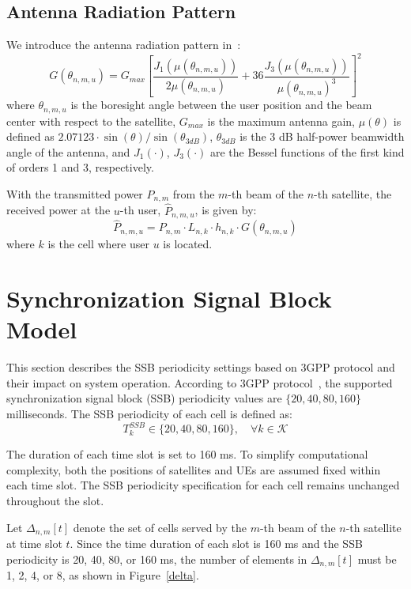 \subsection{Antenna Radiation Pattern}
We introduce the antenna radiation pattern in~\cite{Energy-Efficient}:
\begin{equation}
    G(\theta_{n,m,u}) = G_{max} \left[ \frac{J_1\left(\mu(\theta_{n,m,u})\right)}{2\mu(\theta_{n,m,u})}
    + 36 \frac{J_3\left(\mu(\theta_{n,m,u})\right)}{\mu(\theta_{n,m,u})^3} \right]^2
\end{equation}
where $\theta_{n,m,u}$ is the boresight angle between the user position and the beam center with respect to the satellite, $G_{max}$ is the maximum antenna gain, $\mu(\theta)$ is defined as $2.07123 \cdot \sin(\theta)/\sin(\theta_{3dB})$, $\theta_{3dB}$ is the 3 dB half-power beamwidth angle of the antenna, and $J_1(\cdot)$, $J_3(\cdot)$ are the Bessel functions of the first kind of orders 1 and 3, respectively.

With the transmitted power $P_{n,m}$ from the $m$-th beam of the $n$-th satellite, the received power at the $u$-th user, $\hat{P}_{n,m,u}$, is given by:
\begin{equation}
    \hat{P}_{n,m,u} = P_{n,m} \cdot L_{n,k} \cdot h_{n,k} \cdot G(\theta_{n,m,u})
\end{equation}
where $k$ is the cell where user $u$ is located.

\section{Synchronization Signal Block Model}
This section describes the SSB periodicity settings based on 3GPP protocol and their impact on system operation. According to 3GPP protocol~\cite{38331}, the supported synchronization signal block (SSB) periodicity values are $\{20, 40, 80, 160\}$ milliseconds. The SSB periodicity of each cell is defined as:
\begin{equation}
    T^{SSB}_{k} \in \{20, 40, 80, 160\}, \quad \forall k \in \mathcal{K}
\end{equation}

The duration of each time slot is set to 160 ms. To simplify computational complexity, both the positions of satellites and UEs are assumed fixed within each time slot. The SSB periodicity specification for each cell remains unchanged throughout the slot.

Let $\Delta_{n,m}[t]$ denote the set of cells served by the $m$-th beam of the $n$-th satellite at time slot $t$. Since the time duration of each slot is 160 ms and the SSB periodicity is 20, 40, 80, or 160 ms, the number of elements in $\Delta_{n,m}[t]$ must be 1, 2, 4, or 8, as shown in Figure~\ref{delta}.

